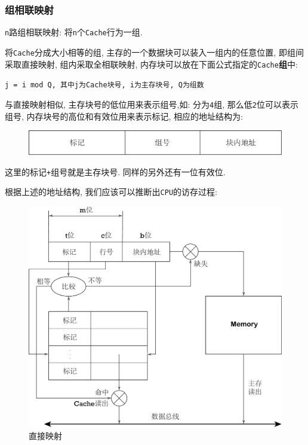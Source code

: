 \subsubsection{组相联映射}
\verb|n|路组相联映射: 将\verb|n|个\verb|Cache|行为一组.\par
将\verb|Cache|分成大小相等的组, 主存的一个数据块可以装入一组内的任意位置, 即组间采取直接映射, 组内采取全相联映射, 内存块可以放在下面公式指定的\verb|Cache|\textbf{组}中:
\begin{center}
\verb|j = i mod Q, 其中j为Cache块号, i为主存块号, Q为组数|
\end{center}\par 
与直接映射相似, 主存块号的低位用来表示组号,如: 分为\verb|4|组, 那么低\verb|2|位可以表示组号, 内存块号的高位和有效位用来表示标记, 相应的地址结构为:
\begin{figure}[H]
\centering
\includegraphics[scale=.5]{img/figure14.pdf}
\end{figure}\par
这里的标记\verb|+|组号就是主存块号. 同样的另外还有一位有效位.\par
根据上述的地址结构, 我们应该可以推断出\verb|CPU|的访存过程:
\begin{figure}[H]
\centering
\includegraphics[scale=.4]{img/figure16.pdf}
\caption*{直接映射}
\end{figure}

